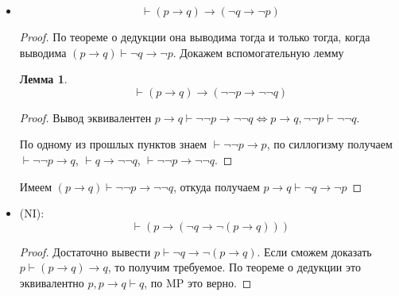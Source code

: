 \documentclass[12pt]{article}
\let\im\rightarrow
\let\n\neg
\theoremstyle{definition}
\theoremstyle{statement}
\theoremstyle{theorem}
\newtheorem{lemma}{Лемма}[section]
\begin{document}
\begin{itemize}
\begin{proof}
\begin{enumerate}
        \item $\vdash p \im \n\n p$ (MP)
      \end{enumerate}
    \end{proof}

  \item
    \[
      \vdash (p \im q) \im (\n q \im \n p)
    \]
    \begin{proof}
      По теореме о дедукции она выводима тогда и только тогда, когда
      выводима $(p \im q) \vdash \n q \im \n p$. Докажем вспомогательную лемму
      \begin{lemma}
        \[
          \vdash (p \im q) \im (\n\n p \im \n\n q)
        \]
        \begin{proof}
          Вывод эквивалентен $p \im q \vdash \n\n p \im \n\n q \iff p
          \im q, \n\n p \vdash \n\n q$.

          По одному из прошлых пунктов знаем $\vdash \n\n p \im p$,
          по силлогизму получаем $\vdash \n\n p \im q$, $\vdash q \im
          \n\n q$, $\vdash \n\n p \im \n\n q$.
        \end{proof}
      \end{lemma}
      Имеем $(p \im q) \vdash \n\n p \im \n\n q$, откуда получаем $p
      \im q \vdash \n q \im \n p$
    \end{proof}

  \item (NI):
    \[
      \vdash (p \im (\n q \im \n(p \im q)))
    \]
    \begin{proof}
      Достаточно вывести $p \vdash \n q \im \n (p \im q)$. Если
      сможем доказать $p \vdash (p \im q) \im q$, то получим
      требуемое. По теореме о дедукции это эквивалентно $p, p \im q
      \vdash q$, по MP это верно.
    \end{proof}
\end{itemize}
\end{document}
